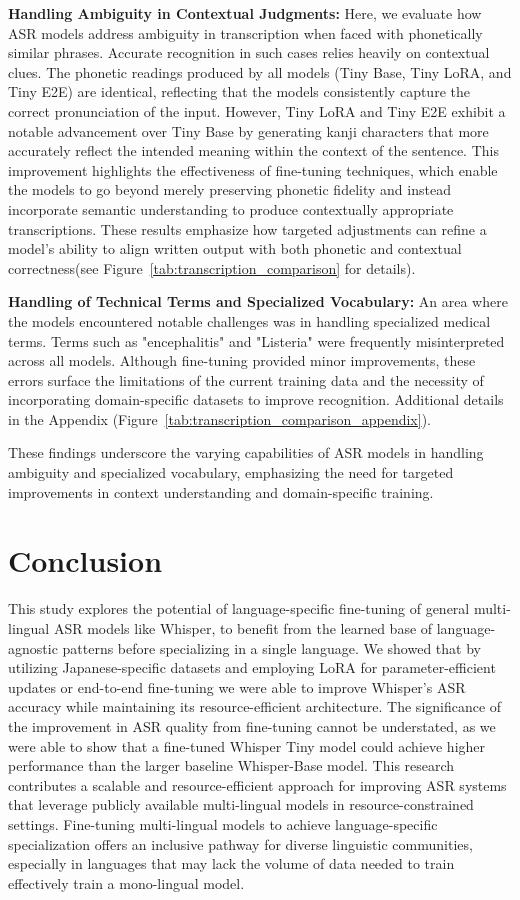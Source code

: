 \documentclass[10pt,twocolumn,letterpaper]{article}
\begin{document}
\textbf{Handling Ambiguity in Contextual Judgments:}
Here, we evaluate how ASR models address ambiguity in transcription when faced with phonetically similar phrases. Accurate recognition in such cases relies heavily on contextual clues. The phonetic readings produced by all models (Tiny Base, Tiny LoRA, and Tiny E2E) are identical, reflecting that the models consistently capture the correct pronunciation of the input. However, Tiny LoRA and Tiny E2E exhibit a notable advancement over Tiny Base by generating kanji characters that more accurately reflect the intended meaning within the context of the sentence. This improvement highlights the effectiveness of fine-tuning techniques, which enable the models to go beyond merely preserving phonetic fidelity and instead incorporate semantic understanding to produce contextually appropriate transcriptions. These results emphasize how targeted adjustments can refine a model's ability to align written output with both phonetic and contextual correctness(see Figure~\ref{tab:transcription_comparison} for details).

\textbf{Handling of Technical Terms and Specialized Vocabulary:}
An area where the models encountered notable challenges was in handling specialized medical terms. Terms such as "encephalitis" and "Listeria" were frequently misinterpreted across all models. Although fine-tuning provided minor improvements, these errors surface the limitations of the current training data and the necessity of incorporating domain-specific datasets to improve recognition. Additional details in the Appendix (Figure~\ref{tab:transcription_comparison_appendix}).

These findings underscore the varying capabilities of ASR models in handling ambiguity and specialized vocabulary, emphasizing the need for targeted improvements in context understanding and domain-specific training. 

\section{Conclusion}
This study explores the potential of language-specific fine-tuning of general multi-lingual ASR models like Whisper, to benefit from the learned base of language-agnostic patterns before specializing in a single language. 
We showed that by utilizing Japanese-specific datasets and employing LoRA for parameter-efficient updates or end-to-end fine-tuning we were able to improve Whisper's ASR accuracy while maintaining its resource-efficient architecture. 
The significance of the improvement in ASR quality from fine-tuning cannot be understated, as we were able to show that a fine-tuned Whisper Tiny model could achieve higher performance than the larger baseline Whisper-Base model. This research contributes a scalable and resource-efficient approach for improving ASR systems that leverage publicly available multi-lingual models in resource-constrained settings.
Fine-tuning multi-lingual models to achieve language-specific specialization offers an inclusive pathway for diverse linguistic communities, especially in languages that may lack the volume of data needed to train effectively train a mono-lingual model.
\end{document}
